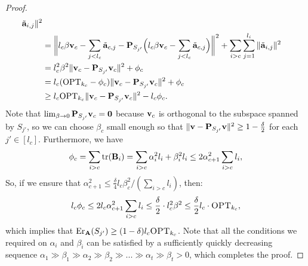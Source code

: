 \documentclass{article}
\begin{document}
\begin{proof}
\begin{align*}
    \tilde{\mathbf a}_{i,j} \|^2\\ 
  &=\bigg\|l_c\beta\mathbf v_c - \sum_{j<l_c}\tilde{\mathbf a}_{c,j}- \mathbf P_{S_{j'}}
    \Big(l_c \beta\mathbf v_c - \sum_{j< l_c}\tilde{\mathbf a}_{c,j} \Big)\bigg\|^2
    +
    \sum_{i>c}\sum_{j=1}^{l_i}\| \tilde{\mathbf a}_{i,j} \|^2
  \\ 
  &= l_c^2\beta^2 \|\mathbf v_c - \mathbf P_{S_{j'}}\mathbf v_c\|^2 + \phi_c \\
  & = l_c (\mathrm{OPT}_{k_c}- \phi_c) \|\mathbf v_c - \mathbf P_{S_{j'}}\mathbf v_c\|^2 + \phi_c \\
  & \geq l_c\mathrm{OPT}_{k_c} \|\mathbf v_c - \mathbf P_{S_{j'}}\mathbf v_c\|^2 - l_c \phi_c. 
\end{align*}	
Note that $\lim_{\beta\rightarrow 0}\mathbf P_{S_{j'}}\mathbf v_c = \mathbf 0$ because $\mathbf v_c$
is orthogonal to the subspace spanned by $S_{j'}$, so we can choose
$\beta_c$ small enough so that
$\|\mathbf v-\mathbf P_{S_{j'}}\mathbf v\|^2\geq 1-\frac\delta2$ for each $j'\in[l_c]$.
Furthermore, we have
\begin{align*}
  \phi_c = \sum_{i>c}\mathrm{tr}(\mathbf B_i) =
  \sum_{i>c}\alpha_i^2l_i+\beta_i^2l_i\leq 2\alpha_{c+1}^2\sum_{i>c}l_i,
\end{align*}
So, if we ensure that $\alpha_{c+1}^2\leq \frac{\delta}{4}
l_c\beta_c^2/(\sum_{i>c}l_i)$, then:
\begin{align*}
  l_c\phi_c \leq 2l_c\alpha_{c+1}^2\sum_{i>c}l_i\leq \frac\delta
  2\cdot l_c^2\beta^2\leq \frac\delta 2 l_c\cdot\textsc{OPT}_{k_c},
\end{align*}
which implies that $\mathrm{Er}_\mathbf A(S_{j'})\geq
(1-\delta)l_c\textsc{OPT}_{k_c}$. Note that all the conditions
we required on $\alpha_i$ and $\beta_i$ can be satisfied by a
sufficiently quickly decreasing sequence
$\alpha_1\gg\beta_1\gg\alpha_2\gg\beta_2\gg...\gg\alpha_t\gg\beta_t>0$,
which completes the proof.
\end{proof}
\end{document}
